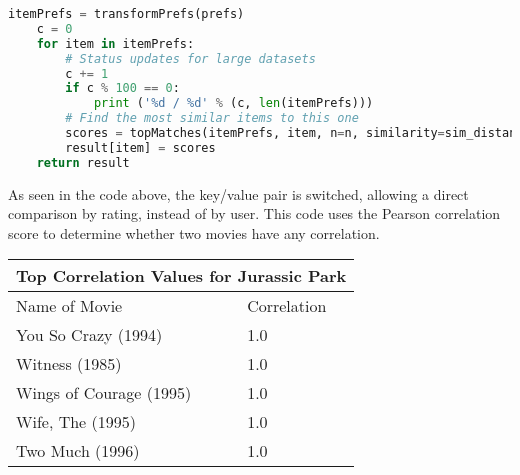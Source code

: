 \documentclass[11pt]{scrartcl} %
\begin{document}
  \begin{lstlisting}[language = Python, caption=Function from Programming Collective Intelligence]
itemPrefs = transformPrefs(prefs)
    c = 0
    for item in itemPrefs:
        # Status updates for large datasets
        c += 1
        if c % 100 == 0:
            print ('%d / %d' % (c, len(itemPrefs)))
        # Find the most similar items to this one
        scores = topMatches(itemPrefs, item, n=n, similarity=sim_distance)
        result[item] = scores
    return result
\end{lstlisting}

\tabto{2.0cm} As seen in the code above, the key/value pair is switched, allowing a direct comparison by rating, instead of by user. This code uses the Pearson correlation score to determine whether two movies have any correlation. \bigskip
\begin{center}
\begin{tabular}{ |p{9cm}||p{3cm}| }
 \hline
 \multicolumn{2}{|c|}{Top Correlation Values for Jurassic Park} \\
 \hline
 Name of Movie & Correlation\\
 \hline
 You So Crazy (1994)   & 1.0 \\
 Witness (1985)&   1.0  \\
 Wings of Courage (1995) & 1.0 \\
 Wife, The (1995) & 1.0 \\
 Two Much (1996)&   1.0 \\
 \hline
\end{tabular}
\end{center}
\end{document}

